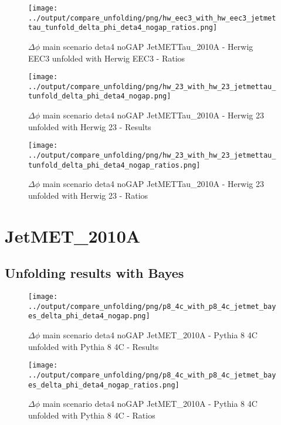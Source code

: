 \documentclass[11pt]{book}
\begin{document}
\begin{figure}[ht]
\centering
\texttt{[image: ../output/compare\_unfolding/png/hw\_eec3\_with\_hw\_eec3\_jetmettau\_tunfold\_delta\_phi\_deta4\_nogap\_ratios.png]}
\caption{$\Delta\phi$ main scenario deta4 noGAP JetMETTau\_2010A - Herwig EEC3 unfolded with Herwig EEC3 - Ratios}
\label{hw_eec3_hw_eec3_jetmettau_tunfold_delta_phi_deta4_nogap_b}
\end{figure}

\begin{figure}[ht]
\centering
\texttt{[image: ../output/compare\_unfolding/png/hw\_23\_with\_hw\_23\_jetmettau\_tunfold\_delta\_phi\_deta4\_nogap.png]}
\caption{$\Delta\phi$ main scenario deta4 noGAP JetMETTau\_2010A - Herwig 23 unfolded with Herwig 23 - Results}
\label{hw_23_hw_23_jetmettau_tunfold_delta_phi_deta4_nogap_a}
\end{figure}

\begin{figure}[ht]
\centering
\texttt{[image: ../output/compare\_unfolding/png/hw\_23\_with\_hw\_23\_jetmettau\_tunfold\_delta\_phi\_deta4\_nogap\_ratios.png]}
\caption{$\Delta\phi$ main scenario deta4 noGAP JetMETTau\_2010A - Herwig 23 unfolded with Herwig 23 - Ratios}
\label{hw_23_hw_23_jetmettau_tunfold_delta_phi_deta4_nogap_b}
\end{figure}


\section{JetMET\_2010A}
\subsection{Unfolding results with Bayes}

\begin{figure}[ht]
\centering
\texttt{[image: ../output/compare\_unfolding/png/p8\_4c\_with\_p8\_4c\_jetmet\_bayes\_delta\_phi\_deta4\_nogap.png]}
\caption{$\Delta\phi$ main scenario deta4 noGAP JetMET\_2010A - Pythia 8 4C unfolded with Pythia 8 4C - Results}
\label{p8_p8_jetmet_bayes_delta_phi_deta4_nogap_a}
\end{figure}

\begin{figure}[ht]
\centering
\texttt{[image: ../output/compare\_unfolding/png/p8\_4c\_with\_p8\_4c\_jetmet\_bayes\_delta\_phi\_deta4\_nogap\_ratios.png]}
\caption{$\Delta\phi$ main scenario deta4 noGAP JetMET\_2010A - Pythia 8 4C unfolded with Pythia 8 4C - Ratios}
\label{p8_p8_jetmet_bayes_delta_phi_deta4_nogap_b}
\end{figure}
\end{document}
